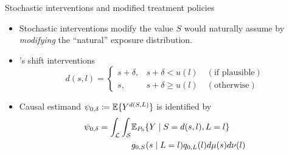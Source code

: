 \documentclass{beamer}
\begin{document}
\begin{frame}[c]{Stochastic interventions and modified treatment policies}

\begin{center}
\begin{itemize}
  \itemsep8pt
  \item Stochastic interventions modify the value $S$ would naturally assume by
    \textit{modifying} the ``natural'' exposure distribution.
  \item \cite{diaz2012population, diaz2018stochastic}'s shift
    interventions\footnotemark
     \begin{equation*}\label{shift_intervention}
       d(s, l) =
         \begin{cases}
           s + \delta, & s + \delta < u(l) \quad (\text{if plausible}) \\
           s, & s + \delta \geq u(l) \quad (\text{otherwise})
         \end{cases}
     \end{equation*}
  \item Causal estimand $\psi_{0,\delta} \coloneqq \mathbb{E} \{Y^{d(S,L)}\}$ is
    identified by
    \begin{align*}\label{eqn:identification2012}
      \psi_{0,\delta} = \int_{\mathcal{L}} \int_{\mathcal{S}} &\mathbb{E}_{P_0}
        \{Y \mid S = d(s, l), L = l\} \\ &g_{0, S}(s \mid L = l)
        q_{0, L}(l) d\mu(s)d\nu(l)
    \end{align*}
\end{itemize}
\end{center}



\end{frame}
\end{document}
